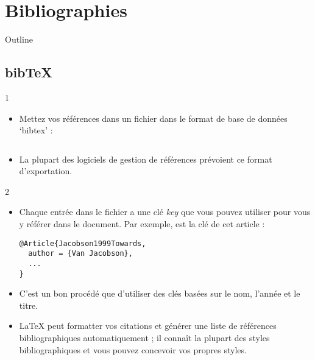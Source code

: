 \documentclass{beamer}
\begin{document}
\section{Bibliographies}

\begin{frame}{Outline}
\begin{multicols}{2}
\tableofcontents[currentsection]
\end{multicols}
\end{frame}

\subsection{bib\TeX}
\begin{frame}[fragile]{\insertsubsection{} 1}
\begin{itemize}
\item Mettez vos références dans un fichier  dans le format de base de données `bibtex' :
\inputminted[fontsize=\scriptsize,frame=single]{latex}{bib-example.bib}
\item La plupart des logiciels de gestion de références prévoient ce format d'exportation.
\end{itemize}
\end{frame}

\begin{frame}[fragile]{\insertsubsection{} 2}
\begin{itemize}
\item Chaque entrée dans le fichier  a une clé \emph{key} que vous pouvez utiliser pour vous y référer dans le document. Par exemple,  est la clé de cet article :
\begin{verbatim}
@Article{Jacobson1999Towards,
  author = {Van Jacobson},
  ...
}
\end{verbatim}
\item C'est un bon procédé que d'utiliser des clés basées sur le nom, l'année et le titre.
\item \LaTeX{} peut formatter vos citations et générer une liste de références bibliographiques automatiquement ; il connaît la plupart des styles bibliographiques et vous pouvez concevoir vos propres styles.
\end{itemize}
\end{frame}
\end{document}
